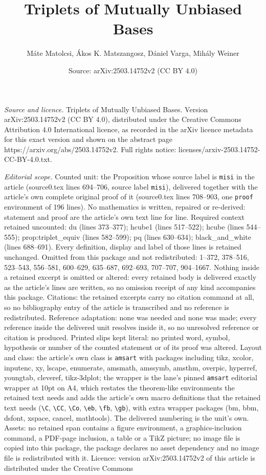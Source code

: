 \documentclass[10pt,a4paper]{amsart}
\title[Triplets of Mutually Unbiased Bases]{Triplets of Mutually Unbiased Bases}
\author{M\'ate Matolcsi, \'Akos K. Matszangosz, D\'aniel Varga, Mih\'aly Weiner}
\date{Source: arXiv:2503.14752v2 (CC BY 4.0)}
\begin{document}
\maketitle

\noindent\emph{Source and licence.} Triplets of Mutually Unbiased Bases. Version arXiv:2503.14752v2 (CC BY 4.0), distributed under the Creative Commons Attribution 4.0 International licence, as recorded in the arXiv licence metadata for this exact version and shown on the abstract page https://arxiv.org/abs/2503.14752v2. Full rights notice: licenses/arxiv-2503.14752-CC-BY-4.0.txt.\par\smallskip

\noindent\textit{Editorial scope.} Counted unit: the Proposition whose source label is \texttt{misi} in the article (source0.tex lines 694--706, source label \texttt{misi}), delivered together with the article's own complete original proof of it (source0.tex lines 708--903, one \texttt{proof} environment of 196 lines). No mathematics is written, repaired or re-derived: statement and proof are the article's own text line for line. Required context retained uncounted: du (lines 373--377); hcube1 (lines 517--522); hcube (lines 544--555); prop:triplet\_equiv (lines 582--599); pq (lines 630--634); black\_and\_white (lines 688--691). Every definition, display and label of those lines is retained unchanged. Omitted from this package and not redistributed: 1--372, 378--516, 523--543, 556--581, 600--629, 635--687, 692--693, 707--707, 904--1667. Nothing inside a retained excerpt is omitted or altered: every retained body is delivered exactly as the article's lines are written, so no omission receipt of any kind accompanies this package. Citations: the retained excerpts carry no citation command at all, so no bibliography entry of the article is transcribed and no reference is redistributed. Reference adaptation: none was needed and none was made; every reference inside the delivered unit resolves inside it, so no unresolved reference or citation is produced. Printed slips kept literal: no printed word, symbol, hypothesis or number of the counted statement or of its proof was altered. Layout and class: the article's own class is \texttt{amsart} with packages including tikz, xcolor, inputenc, xy, lscape, enumerate, amsmath, amssymb, amsthm, overpic, hyperref, youngtab, cleveref, tikz-3dplot; the wrapper is the lane's pinned \texttt{amsart} editorial wrapper at 10pt on A4, which restates the theorem-like environments the retained text needs and adds the article's own macro definitions that the retained text needs (\texttt{\textbackslash C}, \texttt{\textbackslash CC}, \texttt{\textbackslash Co}, \texttt{\textbackslash eb}, \texttt{\textbackslash fb}, \texttt{\textbackslash gb}), with extra wrapper packages (bm, bbm, dsfont, xspace, cancel, mathtools). The delivered numbering is the unit's own. Assets: no retained span contains a figure environment, a graphics-inclusion command, a PDF-page inclusion, a table or a TikZ picture; no image file is copied into this package, the package declares no asset dependency and no image file is redistributed with it. Licence: version arXiv:2503.14752v2 of this article is distributed under the Creative Commons 
\end{document}
